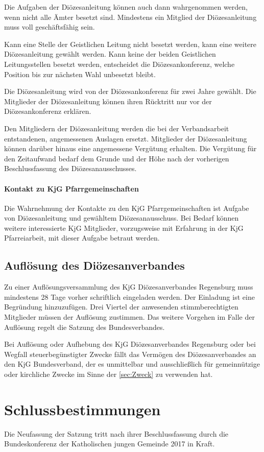 \documentclass[12pt]{report}
\begin{document}
\begin{flushleft}
Die Aufgaben der Diözesanleitung können auch dann wahrgenommen werden, wenn nicht alle
Ämter besetzt sind. Mindestens ein Mitglied der Diözesanleitung muss voll geschäftsfähig sein.

Kann eine Stelle der Geistlichen Leitung nicht besetzt werden, kann eine weitere Diözesanleitung
gewählt werden. Kann keine der beiden Geistlichen Leitungsstellen besetzt werden, entscheidet
die Diözesankonferenz, welche Position bis zur nächsten Wahl unbesetzt bleibt.

Die Diözesanleitung wird von der Diözesankonferenz für zwei Jahre gewählt. Die Mitglieder der
Diözesanleitung können ihren Rücktritt nur vor der Diözesankonferenz erklären.

Den Mitgliedern der Diözesanleitung werden die bei der Verbandsarbeit entstandenen, angemessenen Auslagen
ersetzt. Mitglieder der Diözesanleitung können darüber hinaus eine angemessene Vergütung erhalten.
Die Vergütung für den Zeitaufwand bedarf dem Grunde und der Höhe nach der vorherigen Beschlussfassung
des Diözesanausschusses.

\subsubsection{Kontakt zu KjG Pfarrgemeinschaften}
Die Wahrnehmung der Kontakte zu den KjG Pfarrgemeinschaften ist Aufgabe von Diözesanleitung
und gewähltem Diözesanausschuss. Bei Bedarf können weitere interessierte KjG Mitglieder,
vorzugsweise mit Erfahrung in der KjG Pfarreiarbeit, mit dieser Aufgabe betraut werden.

\section{Auflösung des Diözesanverbandes}
Zu einer Auflösungsversammlung des KjG Diözesanverbandes Regensburg muss mindestens 28 Tage vorher
schriftlich eingeladen werden. Der Einladung ist eine Begründung hinzuzufügen. Drei Viertel der
anwesenden stimmberechtigten Mitglieder müssen der Auflösung zustimmen. Das weitere Vorgehen
im Falle der Auflösung regelt die Satzung des Bundesverbandes.

Bei Auflösung oder Aufhebung des KjG Diözesanverbandes Regensburg oder bei Wegfall steuerbegünstigter
Zwecke fällt das Vermögen des Diözesanverbandes an den KjG Bundesverband, der es unmittelbar und
ausschließlich für gemeinnützige oder kirchliche Zwecke im Sinne der \ref{sec:Zweck} zu verwenden hat.
\chapter{Schlussbestimmungen}
Die Neufassung der Satzung tritt nach ihrer Beschlussfassung durch die Bundeskonferenz der
Katholischen jungen Gemeinde 2017 in Kraft.

\end{flushleft}
\end{document}
